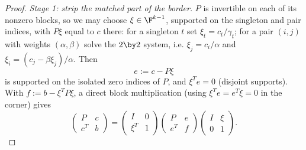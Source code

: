 \begin{proof}
  \emph{Stage 1: strip the matched part of the border.}
  $P$ is invertible on each of its nonzero blocks, so we may choose
  $\xi \in \F^{k-1}$, supported on the singleton and pair indices, with
  $P \xi$ equal to $c$ there: for a singleton $t$ set
  $\xi_t = c_t / \gamma_t$; for a pair $(i,j)$ with weights
  $(\alpha, \beta)$ solve the $2 \by 2$ system, i.e.
  $\xi_j = c_i / \alpha$ and $\xi_i = (c_j - \beta \xi_j)/\alpha$.  Then
  \[
    e := c - P\xi
  \]
  is supported on the isolated zero indices of $P$, and $\xi^T e = 0$
  (disjoint supports).  With $f := b - \xi^T P \xi$, a direct block
  multiplication (using $\xi^T e = e^T \xi = 0$ in the corner) gives
  \begin{equation}\label{eq:peel-sym}
    \begin{pmatrix}
      P & c\\
      c^T & b
    \end{pmatrix}
    =
    \begin{pmatrix}
      I & 0\\
      \xi^T & 1
    \end{pmatrix}
    \begin{pmatrix}
      P & e\\
      e^T & f
    \end{pmatrix}
    \begin{pmatrix}
      I & \xi\\
      0 & 1
    \end{pmatrix}.
  \end{equation}


\end{proof}

